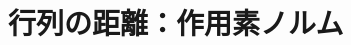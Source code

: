 \documentclass[../../../topic_linear-algebra]{subfiles}
\begin{document}
\sectionline
\section{行列の距離：作用素ノルム}

\todo{}
\end{document}
